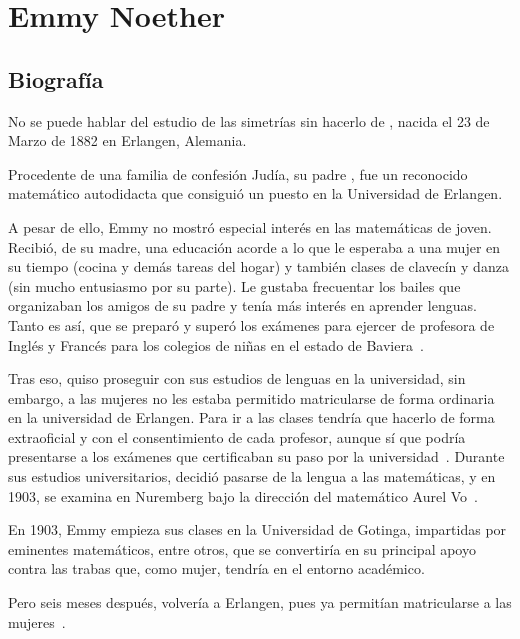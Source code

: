 \section{Emmy Noether}\label{sec:emmy-noether}

\subsection{Biografía}\label{subsec:biografia}

No se puede hablar del estudio de las simetrías sin hacerlo de , nacida el 23 de Marzo de 1882 en Erlangen, Alemania.

Procedente de una familia de confesión Judía, su padre , fue un reconocido matemático autodidacta que consiguió un puesto en la Universidad de Erlangen.

A pesar de ello, Emmy no mostró especial interés en las matemáticas de joven.
Recibió, de su madre, una educación acorde a lo que le esperaba a una mujer en su tiempo (cocina y demás tareas del hogar) y también clases de clavecín y danza (sin mucho entusiasmo por su parte).
Le gustaba frecuentar los bailes que organizaban los amigos de su padre y tenía más interés en aprender lenguas.
Tanto es así, que se preparó y superó los exámenes para ejercer de profesora de Inglés y Francés para los colegios de niñas en el estado de Baviera~\cite{Carrasco}.

Tras eso, quiso proseguir con sus estudios de lenguas en la universidad, sin embargo, a las mujeres no les estaba permitido matricularse de forma ordinaria en la universidad de Erlangen.
Para ir a las clases tendría que hacerlo de forma extraoficial y con el consentimiento de cada profesor, aunque sí que podría presentarse a los exámenes que certificaban su paso por la universidad~\cite{Kimberling}.
Durante sus estudios universitarios, decidió pasarse de la lengua a las matemáticas, y en 1903, se examina en Nuremberg bajo la dirección del matemático Aurel Vo\beta~\cite{Kimberling}.

En 1903, Emmy empieza sus clases en la Universidad de Gotinga, impartidas por eminentes matemáticos, entre otros,  que se convertiría en su principal apoyo contra las trabas que, como mujer, tendría en el entorno académico.

Pero seis meses después, volvería a Erlangen, pues ya permitían matricularse a las mujeres~\cite{Kimberling}.

